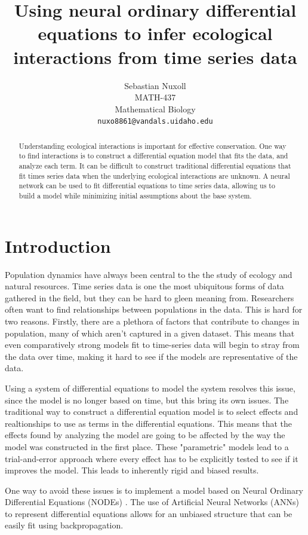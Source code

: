 \documentclass{article}
\title{Using neural ordinary differential equations to infer ecological interactions from time series data}
\author{Sebastian Nuxoll \\ MATH-437 \\ Mathematical Biology \\ {\tt nuxo8861@vandals.uidaho.edu}}
\begin{document}
\maketitle
\begin{abstract}
Understanding ecological interactions is important for effective conservation. One way to find interactions is to construct a differential equation model that fits the data, and analyze each term. It can be difficult to construct traditional differential equations that fit times series data when the underlying ecological interactions are unknown. A neural network can be used to fit differential equations to time series data, allowing us to build a model while minimizing initial assumptions about the base system.
\end{abstract}

\section{Introduction}

Population dynamics have always been central to the the study of ecology and natural resources. Time series data is one the most ubiquitous forms of data gathered in the field, but they can be hard to gleen meaning from. Researchers often want to find relationships between populations in the data. This is hard for two reasons. Firstly, there are a plethora of factors that contribute to changes in population, many of which aren't captured in a given dataset. This means that even comparatively strong models fit to time-series data will begin to stray from the data over time, making it hard to see if the models are representative of the data.

Using a system of differential equations to model the system resolves this issue, since the model is no longer based on time, but this bring its own issues. The traditional way to construct a differential equation model is to select effects and realtionships to use as terms in the differential equations. This means that the effects found by analyzing the model are going to be affected by the way the model was constructed in the first place. These "parametric" models lead to a trial-and-error approach where every effect has to be explicitly tested to see if it improves the model. This leads to inherently rigid and biased results.

One way to avoid these issues is to implement a model based on Neural Ordinary Differential Equations (NODEs) \cite{earlierpaper}. The use of Artificial Neural Networks (ANNs) to represent differential equations allows for an unbiased structure that can be easily fit using backpropagation. 
\end{document}
